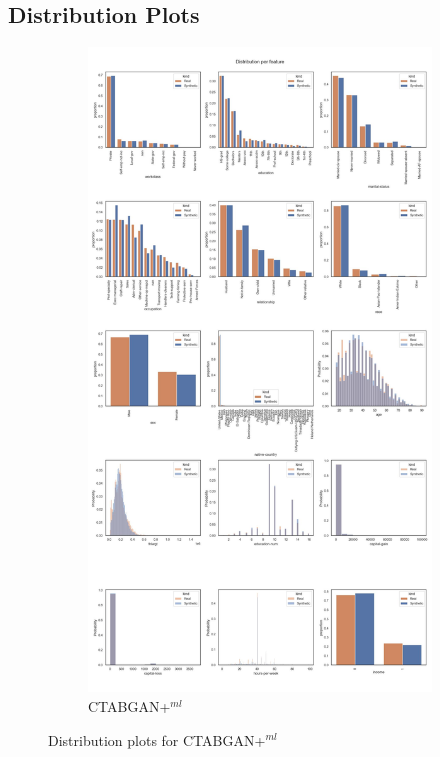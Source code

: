 \subsection[]{Distribution Plots}
\label{A:distributions}
\begin{figure}[h]
	\centering
	\begin{subfigure}{0.6\textwidth}
		\includegraphics[width=\linewidth]{images/distributions_full/ctabgan+.jpg}
		\caption{CTABGAN+$^{ml}$}
	\end{subfigure}
	\caption[Distribution plots CTABGAN+ Models]{Distribution plots for CTABGAN+$^{ml}$}
	\label{fig_a:dist_0}
\end{figure}


